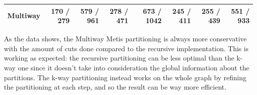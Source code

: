 \documentclass[unicode,11pt,a4paper,oneside,numbers=endperiod,openany]{scrartcl}
\begin{document}
\begin{table}[H]
\begin{tabular}{l|r|r|r|r|r|r|r|}
Multiway  & 170 / 279                                                                        & 579 / 961                                                                         & 278 / 471                                                                     & 673 / 1042                                                                         & 245 / 411                                                                      & 255 / 439                                                                     & 551 / 933                                                                     \\ \hline
\end{tabular}
\end{table}

As the data shows, the Multiway Metis partitioning is always more conservative with the amount of cuts done compared to the recursive implementation.
\newline
This is working as expected: the recursive partitioning can be less optimal than the k-way one since it doesn't take into consideration the global information about the partitions. The k-way partitioning instead works on the whole graph by refining the partitioning at each step, and so the result can be way more efficient.
\end{document}
